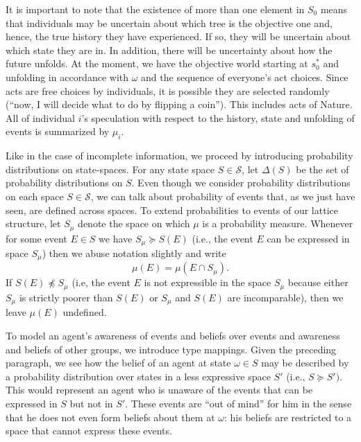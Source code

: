 \documentclass[
11pt,
titlepage,
reqno,
]{article}%
\theoremstyle{definition}
\begin{document}
	It is important to note that the existence of more than one element in $S_0$ means that individuals may be uncertain about which tree is the objective one and, hence, the true history they have experienced. 
	If so, they will be uncertain about which state they are in. 
	In addition, there will be uncertainty about how the future unfolds. 
	At the moment, we have the objective world starting at $s_0^\ast$ and unfolding in accordance with $\omega$ and the sequence of everyone's act choices. 
	Since  acts are free choices by individuals, it is possible they are selected randomly (``now, I will decide what to do by flipping a coin'').
	This includes acts of Nature.
	All of individual $i$'s speculation with respect to the history, state and unfolding of events is summarized by $\mu_i$.


Like in the case of incomplete information, we proceed by introducing probability distributions on state-spaces. For any state space $S \in \mathcal{S}$, let $\Delta(S)$ be the set of probability distributions on $S$. Even though we consider probability distributions on each space $S \in \mathcal{S}$, we can talk about probability of events that, as we just have seen, are defined across spaces. To extend probabilities to events of our lattice structure, let $S_{\mu}$ denote the space on which $\mu$ is a probability measure. Whenever for some event $E \in S$ we have $S_{\mu} \succeq S(E)$ (i.e., the event $E$ can be expressed in space $S_{\mu}$) then we abuse notation slightly and write
\begin{equation*}
\mu \left( E \right) = \mu \left( E\cap S_{\mu}\right).
\end{equation*}
If $S(E) \npreceq S_{\mu}$ (i.e, the event $E$ is not expressible in the space $S_{\mu}$ because either $S_{\mu}$ is strictly poorer than $S(E)$ or $S_{\mu}$ and $S(E)$ are incomparable), then we leave $\mu(E)$ undefined.

To model an agent's awareness of events and beliefs over events and awareness and beliefs of other groups, we introduce type mappings. Given the preceding paragraph, we see how the belief of an agent at state $\omega \in S$ may be described by a probability distribution over states in a less expressive space $S'$ (i.e., $S \succeq S')$. This would represent an agent who is unaware of the events that can be expressed in $S$ but not in $S'$. These events are ``out of mind'' for him in the sense that he does not even form beliefs about them at $\omega$:  his beliefs are restricted to a space that cannot express these events.
\end{document}
